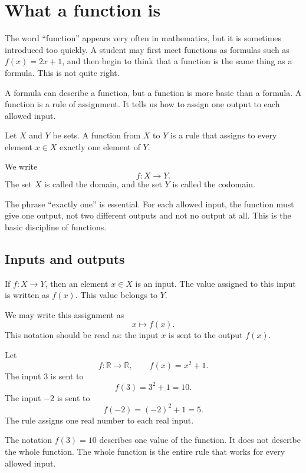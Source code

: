 \section{What a function is}

The word ``function'' appears very often in mathematics, but it is sometimes introduced too quickly. A student may first meet functions as formulas such as \(f(x)=2x+1\), and then begin to think that a function is the same thing as a formula. This is not quite right.

A formula can describe a function, but a function is more basic than a formula. A function is a rule of assignment. It tells us how to assign one output to each allowed input.

\begin{definitionbox}
Let \(X\) and \(Y\) be sets. A function from \(X\) to \(Y\) is a rule that assigns to every element \(x\in X\) exactly one element of \(Y\).

We write
\[
f:X\to Y.
\]
The set \(X\) is called the domain, and the set \(Y\) is called the codomain.
\end{definitionbox}

The phrase ``exactly one'' is essential. For each allowed input, the function must give one output, not two different outputs and not no output at all. This is the basic discipline of functions.

\subsection*{Inputs and outputs}

If \(f:X\to Y\), then an element \(x\in X\) is an input. The value assigned to this input is written as \(f(x)\). This value belongs to \(Y\).

We may write this assignment as
\[
x\mapsto f(x).
\]
This notation should be read as: the input \(x\) is sent to the output \(f(x)\).

\begin{examplebox}
Let
\[
f:\mathbb{R}\to\mathbb{R},
\qquad
f(x)=x^2+1.
\]
The input \(3\) is sent to
\[
f(3)=3^2+1=10.
\]
The input \(-2\) is sent to
\[
f(-2)=(-2)^2+1=5.
\]
The rule assigns one real number to each real input.
\end{examplebox}

The notation \(f(3)=10\) describes one value of the function. It does not describe the whole function. The whole function is the entire rule that works for every allowed input.

